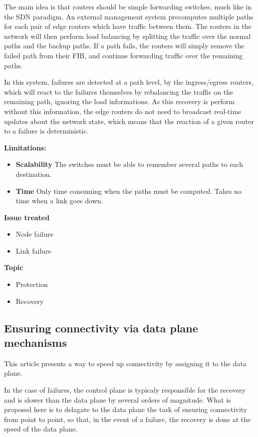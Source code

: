 \documentclass[compsoc]{IEEEtran}
\begin{document}
The main idea is that routers should be simple forwarding switches, much like in the SDN paradigm. An external management system precomputes multiple paths for each pair of edge routers which have traffic between them. The routers in the network will then perform load balancing by splitting the traffic over the normal paths and the backup paths. If a path fails, the routers will simply remove the failed path from their FIB, and continue forwarding traffic over the remaining paths.

In this system, failures are detected at a path level, by the ingress/egress routers, which will react to the failures themselves by rebalancing the traffic on the remaining path, ignoring the load informations. As this recovery is perform without this information, the edge routers do not need to broadcast real-time updates about the network state, which means that the reaction of a given router to a failure is deterministic. 

\textbf{Limitations:}
\begin{itemize}
	\item \textbf{Scalability} The switches must be able to remember several paths to each destination. 
	\item \textbf{Time} Only time consuming when the paths must be computed. Takes no time when a link goes down.
\end{itemize}

\textbf{Issue treated}
\begin{itemize}
	\item Node failure
	\item Link failure
\end{itemize}

\textbf{Topic}
\begin{itemize}
	\item Protection
	\item Recovery
\end{itemize}

\subsection{Ensuring connectivity via data plane mechanisms \cite{Liu:2013:ECV:2482626.2482639}}
This article presents a way to speed up connectivity by assigning it to the data plane.

In the case of failures, the control plane is typicaly responsible for the recovery and is slower than the data plane by several orders of magnitude. What is proposed here is to delagate to the data plane the task of ensuring connectivity from point to point, so that, in the event of a failure, the recovery is done at the speed of the data plane.
\end{document}
